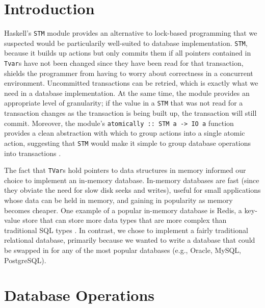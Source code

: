 \documentclass[10pt]{article}
\begin{document}
\vspace{5mm}
\begin{multicols}{2}

\section{Introduction} 
Haskell's \texttt{STM} module provides an alternative to lock-based programming that we suspected would be particularily well-suited to database implementation. \texttt{STM}, because it builds up actions but only commits them if all pointers contained in \texttt{Tvar}s have not been changed since they have been read for that transaction, shields the programmer from having to worry about correctness in a concurrent environment. Uncommitted transactions can be retried, which is exactly what we need in a database implementation. At the same time, the module provides an appropriate level of granularity; if the value in a \texttt{STM} that was not read for a transaction changes as the transaction is being built up, the transaction will still commit. Moreover, the module's \texttt{atomically :: STM a -> IO a} function provides a clean abstraction with which to group actions into a single atomic action, suggesting that \texttt{STM} would make it simple to group database operations into transactions \cite{harris}. 

The fact that \texttt{TVar}s hold pointers to data structures in memory informed our choice to implement an in-memory database. In-memory databases are fast (since they obviate the need for slow disk seeks and writes), useful for small applications whose data can be held in memory, and gaining in popularity as memory becomes cheaper. One example of a popular in-memory database is Redis, a key-value store that can store more data types that are more complex than traditional SQL types \cite{redis}. In contrast, we chose to implement a fairly traditional relational database, primarily because we wanted to write a database that could be swapped in for any of the most popular databases (e.g., Oracle, MySQL, PostgreSQL). 

\section{Database Operations}

\end{multicols}
\end{document}
